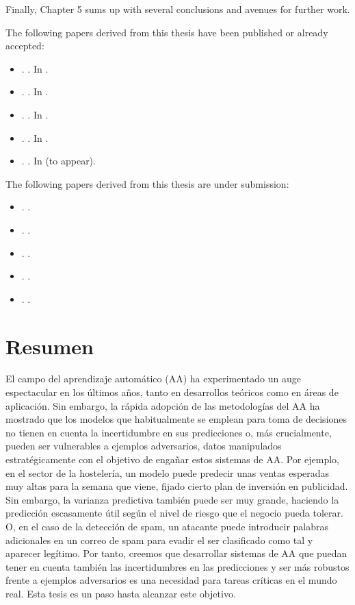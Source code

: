 \documentclass[a4paper, 11pt, openright, twoside]{reportPhD}
\numberwithin{figure}{chapter}
\numberwithin{table}{chapter}
\numberwithin{equation}{chapter}
\begin{document}
Finally, Chapter 5 sums up with several conclusions and avenues for further work.


The following papers derived from this thesis have been published or already accepted:
\begin{itemize}
    \item \cite{gallego2019dlms}. . In .
    \item \cite{gallego2019reinforcement}. . In .
     \item \cite{gallego2019vis}. . In .   
     \item \cite{math8111957}. . In .
     \item \cite{nn2022}. . In  (to appear).
\end{itemize}

The following papers derived from this thesis are under submission:
\begin{itemize}
    \item \cite{gallego2019opponent}. . 
        \item \cite{gallego2021data}. . 
    \item \cite{gallego2018stochastic}. . 
    \item \cite{AMLARA}. . 
     \item \cite{gallego2020protecting}. . 
\end{itemize}

\chapter*{Resumen}

El campo del aprendizaje automático (AA) ha experimentado un auge espectacular en los últimos años, tanto en desarrollos teóricos como en áreas de aplicación. Sin embargo, la rápida adopción  de las metodologías del AA ha mostrado que los modelos que habitualmente se emplean para toma de decisiones no tienen en cuenta la incertidumbre en sus predicciones o, más crucialmente, pueden ser vulnerables a ejemplos adversarios, datos manipulados estratégicamente con el objetivo de engañar estos sistemas de AA. Por ejemplo, en el sector de la hostelería, un modelo puede predecir unas ventas esperadas muy altas para la semana que viene, fijado cierto plan de inversión en publicidad. Sin embargo, la varianza predictiva también puede ser muy grande, haciendo la predicción escasamente útil según el nivel de riesgo que el negocio pueda tolerar. O, en el caso de la detección de spam, un atacante puede introducir palabras adicionales en un correo de spam  para evadir el ser clasificado como tal y aparecer  legítimo.
Por tanto, creemos que desarrollar sistemas de AA que puedan tener en cuenta también las incertidumbres en las predicciones y ser más robustos frente a ejemplos adversarios es una necesidad para tareas críticas en el mundo real. Esta tesis es un paso hasta alcanzar este objetivo.
\end{document}

